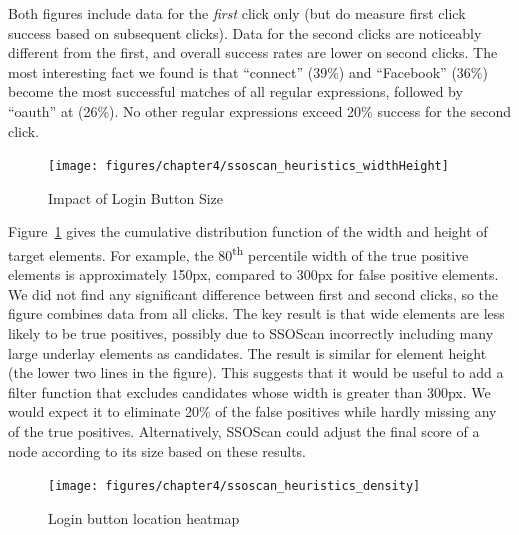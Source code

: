 Both figures include data for the \emph{first} click only (but do measure first click success based on subsequent clicks).  Data for the second clicks are noticeably different from the first, and overall success rates are lower on second clicks.  The most interesting fact we found is that ``connect'' (39\%) and ``Facebook'' (36\%) become the most successful matches of all regular expressions, followed by ``oauth'' at (26\%).  No other regular expressions exceed 20\% success for the second click.  


\begin{figure}[htb]
\centering
\texttt{[image: figures/chapter4/ssoscan\_heuristics\_widthHeight]}
\caption{Impact of Login Button Size}
\label{fig:ssoscan_heuristics_widthHeight}
\end{figure}

 Figure~\ref{fig:ssoscan_heuristics_widthHeight} gives the cumulative distribution function of the width and height of target elements.  For example, the 80\textsuperscript{th} percentile width of the true positive elements is approximately 150px, compared to 300px for false positive elements.  We did not find any significant difference between first and second clicks, so the figure combines data from all clicks.  The key result is that wide elements are less likely to be true positives, possibly due to SSOScan incorrectly including many large underlay elements as candidates.  The result is similar for element height (the lower two lines in the figure).  This suggests that it would be useful to add a filter function that excludes candidates whose width is greater than 300px.  We would expect it to eliminate 20\% of the false positives while hardly missing any of the true positives.  Alternatively, SSOScan could adjust the final score of a node according to its size based on these results.

\begin{figure}[tb]
\centering
\texttt{[image: figures/chapter4/ssoscan\_heuristics\_density]}
\caption{Login button location heatmap}
\label{fig:ssoscan_heuristics_density}
\end{figure}

